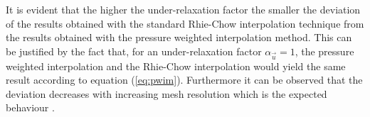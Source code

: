 It is evident that the higher the under-relaxation factor the smaller the deviation of the results obtained with the standard Rhie-Chow interpolation technique from the results obtained with the pressure weighted interpolation method. This can be justified by the fact that, for an under-relaxation factor \(\alpha_\vec{u} = 1\), the pressure weighted interpolation and the Rhie-Chow interpolation would yield the same result according to equation (\ref{eq:pwim}). Furthermore it can be observed that the deviation decreases with increasing mesh resolution which is the expected behaviour \cite{ferziger02}.

